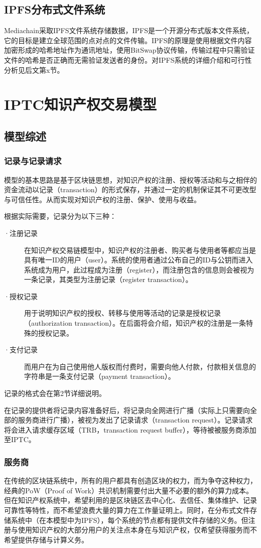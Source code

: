 \documentclass[withoutpreface,bwprint]{cumcmthesis} %
\begin{document}
\subsection{IPFS分布式文件系统}

Mediachain采取IPFS文件系统存储数据，IPFS是一个开源分布式版本文件系统，它的目标是建立全球范围的点对点的文件传输。IPFS的原理是使用根据文件内容加密形成的哈希地址作为通讯地址，使用BitSwap协议传输，传输过程中只需验证文件的哈希是否正确而无需验证发送者的身份。对IPFS系统的详细介绍和可行性分析见后文第x节。


\section{IPTC知识产权交易模型}
\subsection{模型综述}
\subsubsection{记录与记录请求}
模型的基本思路是基于区块链思想，对知识产权的注册、授权等活动和与之相伴的资金流动以记录（transaction）的形式保存，并通过一定的机制保证其不可更改型与可信任性。从而实现对知识产权的注册、保护、使用与收益。

根据实际需要，记录分为以下三种：
\begin{description}
	\item[·注册记录] 在知识产权交易链模型中，知识产权的注册者、购买者与使用者等都应当是具有唯一ID的用户（user）。系统的使用者通过公布自己的ID与公钥而进入系统成为用户，此过程成为注册（register），而注册包含的信息则会被视为一条记录，其类型为注册记录（register transaction）。
	\item[·授权记录] 用于说明知识产权的授权、转移与使用等活动的记录是授权记录（authorization transaction）。在后面将会介绍，知识产权的注册是一条特殊的授权记录。
	\item[·支付记录] 而用户在为自己使用他人版权而付费时，需要向他人付款，付款相关信息的字符串是一条支付记录（payment transaction）。
\end{description}
记录的格式会在第2节详细说明。

在记录的提供者将记录内容准备好后，将记录向全网进行广播（实际上只需要向全部的服务商进行广播），被视为发出了记录请求（transaction request）。记录请求将会进入请求缓存区域（TRB，transaction request buffer），等待被被服务商添加至IPTC。

\subsubsection{服务商}
在传统的区块链系统中，所有的用户都具有创造区块的权力，而为争夺这种权力，经典的PoW（Proof of
 Work）共识机制需要付出大量不必要的额外的算力成本。但在知识产权系统中，希望利用的是区块链区去中心化、去信任、集体维护、记录可靠性等特性，而不希望浪费大量的算力在工作量证明上。同时，在分布式文件存储系统中（在本模型中为IPFS），每个系统的节点都有提供文件存储的义务。但注册与使用知识产权的大部分用户的关注点本身在与知识产权，仅希望获得服务而不希望提供存储与计算义务。
 
\end{document}
